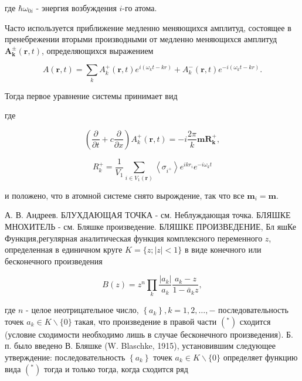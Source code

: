 \documentclass[10pt]{article}
\begin{document}
где $\hbar \omega_{0 i}$ - энергия возбуждения $i$-го атома.



Часто используется приближение медленно меняющихся амплитуд, состоящее в пренебрежении вторыми производными от медленно меняющихся амплитуд $\boldsymbol{A}_{\boldsymbol{k}}^{ \pm}(\boldsymbol{r}, t)$, определяющихся выражением



\[

A(\boldsymbol{r}, t)=\sum_{k} A_{k}^{+}(\boldsymbol{r}, t) e^{i\left(\omega_{k} t-k r\right)}+A_{k}^{-}(\boldsymbol{r}, t) e^{-i\left(\omega_{k} t-k r\right)} .

\]



Тогда первое уравнение системы принимает вид



где



\[

\left(\frac{\partial}{\partial t}+c \frac{\partial}{\partial x}\right) A_{k}^{+}(\boldsymbol{r}, t)=-i \frac{2 \pi}{k} \boldsymbol{m} \boldsymbol{R}_{\boldsymbol{k}}^{+},

\]



\[

R_{k}^{+}=\frac{1}{V_{1}} \sum_{i \in V_{1}(\boldsymbol{r})}\left\langle\sigma_{i^{+}}\right\rangle e^{i k r_{i}} e^{-i \omega_{k} t}

\]



и положено, что в атомной системе снято вырождение, так что все $\boldsymbol{m}_{i}=\boldsymbol{m}$.



А. В. Андреев. БЛУХДАЮЩАЯ ТОЧКА - см. Неблуждающая точка. БЛЯШКЕ МНОХИТЕЛЬ - см. Бляшке произведение. БЛЯШКЕ ПРОИЗВЕДЕНИЕ, Бл яшКе Функция,регулярная аналитическая функция комплексного переменного $z$, определенная в единичном круге $K=\{z ;|z|<1\}$ в виде конечного или бесконечного произведения



\[

B(z)=z^{n} \prod_{k} \frac{\left|a_{k}\right|}{a_{k}} \frac{a_{k}-z}{1-\bar{a}_{k} z},

\]



где $n$ - целое неотрицательное число, $\left\{a_{k}\right\}, k=1,2, \ldots,-$ последовательность точек $a_{k} \in K \backslash\{0\}$ такая, что произведение в правой части $\left({ }^{*}\right)$ сходится (условие сходимости необходимо лишь в случае бесконечного произведения). Б. п. было введено В. Бляшке (W. Blaschke, 1915), установившим следующее утверждение: последовательность $\left\{a_{k}\right\}$ точек $a_{k} \in K \backslash\{0\}$ определяет функцию вида $\left(^{*}\right)$ тогда и только тогда, когда сходится ряд
\end{document}

